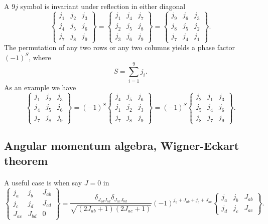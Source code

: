 \documentclass[%
twoside,                 %
final,                   %
10pt]{article}
\begin{document}
\paragraph{}
A $9j$ symbol is invariant under reflection in either diagonal
\[
    \begin{Bmatrix} j_1 & j_2 & j_3\\ j_4 & j_5 & j_6\\ j_7 & j_8 & j_9 \end{Bmatrix} = \begin{Bmatrix} j_1 & j_4 & j_7\\ j_2 & j_5 & j_8\\ j_3 & j_6 & j_9 \end{Bmatrix} = \begin{Bmatrix} j_9 & j_6 & j_3\\ j_8 & j_5 & j_2\\ j_7 & j_4 & j_1 \end{Bmatrix}. 
\]
The permutation of any two rows or any two columns yields a phase factor $(-1)^S$, where
\[
    S=\sum_{i=1}^9 j_i. 
\]
As an  example we have
\[
    \begin{Bmatrix} j_1 & j_2 & j_3\\ j_4 & j_5 & j_6\\ j_7 & j_8 & j_9 \end{Bmatrix} = (-1)^S \begin{Bmatrix} j_4 & j_5 & j_6\\ j_1 & j_2 & j_3\\ j_7 & j_8 & j_9 \end{Bmatrix} = (-1)^S \begin{Bmatrix} j_2 & j_1 & j_3\\ j_5 & j_4 & j_6\\ j_8 & j_7 & j_9 \end{Bmatrix}. 
\]



\subsection*{Angular momentum algebra, Wigner-Eckart theorem}

\paragraph{}
A useful case is when say $J=0$ in 
\[
\left\{\begin{array}{ccc} j_a & j_b& J_{ab} \\ j_c & j_d & J_{cd} \\ J_{ac} & J_{bd}& 0\end{array}\right\}=\frac{\delta_{J_{ab}J_{cd}} \delta_{J_{ac}J_{bd}}}{\sqrt{(2J_{ab}+1)(2J_{ac}+1)}} (-1)^{j_b+J_{ab}+j_c+J_{ac}} \begin{Bmatrix} j_a & j_b & J_{ab}\\ j_d & j_c & J_{ac} \end{Bmatrix}. 
\]
\end{document}
